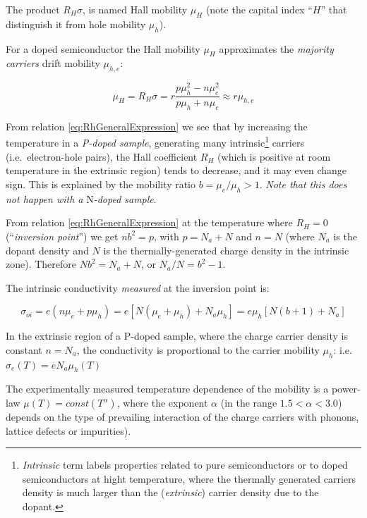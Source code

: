 \documentclass[]{book}
\let\rmarkdownfootnote\footnote%
\def\footnote{\protect\rmarkdownfootnote}
\begin{document}
The product \(R_H \sigma\), is named Hall mobility \(\mu_H\) (note the
capital index ``\(H\)'' that distinguish it from hole mobility
\(\mu_h\)).

For a doped semiconductor the Hall mobility \(\mu_H\) approximates the
\emph{majority carriers} drift mobility \(\mu_{h,e}\):

\begin{equation}
\mu _{ H }=R_{ H }\sigma =r\frac { p \mu^2_h - n \mu^2_e }{p \mu_h + n \mu_e} \approx r \mu_{h,e} 
\label{eq:muApproximateDriftMobility}
\end{equation}

From relation \eqref{eq:RhGeneralExpression} we see that by increasing the
temperature in a \emph{P-doped sample}, generating many
intrinsic\footnote{\emph{Intrinsic} term labels properties related to
  pure semiconductors or to doped semiconductors at hight temperature,
  where the thermally generated carriers density is much larger than the
  (\emph{extrinsic}) carrier density due to the dopant.} carriers
(i.e.~electron-hole pairs), the Hall coefficient \(R_H\) (which is
positive at room temperature in the extrinsic region) tends to decrease,
and it may even change sign. This is explained by the mobility ratio
\(b=\mu_e/\mu_h>1\). \emph{Note that this does not happen with a}
N\emph{-doped sample}.

From relation \eqref{eq:RhGeneralExpression} at the temperature where
\(R_H=0\) (``\emph{inversion point}'') we get \(nb^2=p\), with
\(p=N_a+N\) and \(n=N\) (where \(N_a\) is the dopant density and \(N\)
is the thermally-generated charge density in the intrinsic zone).
Therefore \(Nb^2= N_a+N\), or \(N_a/N=b^2-1\).

The intrinsic conductivity \emph{measured} at the inversion point is:

\begin{equation}
\sigma_{oi} = e(n \mu_e + p \mu_h ) = e[N( \mu_e + \mu_h)+ N_a \mu_h ] = e \mu_h [N(b+1)+N_a]
\label{eq:intrinsicConductivityInvPoint}
\end{equation}

In the extrinsic region of a P-doped sample, where the charge carrier
density is constant \(n=N_a\), the conductivity is proportional to the
carrier mobility \(\mu_h\): i.e. \(\sigma_e(T) = eN_a \mu_h(T)\)

The experimentally measured temperature dependence of the mobility is a
power-law \(\mu(T)=const( T^\alpha)\), where the exponent \(\alpha\) (in
the range \(1.5<\alpha<3.0\)) depends on the type of prevailing
interaction of the charge carriers with phonons, lattice defects or
impurities).
\end{document}
